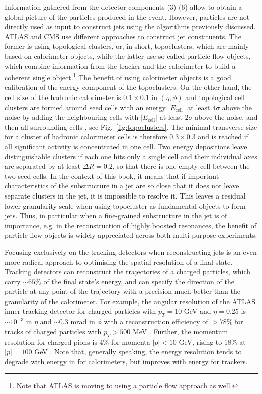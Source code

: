 Information gathered from the detector components (3)-(6) allow to
obtain a global picture of the particles produced in the
event. However, particles are not directly used as input to construct
jets using the algorithms previously discussed. ATLAS and CMS use
different approaches to construct jet constituents. The former is
using topological clusters, or, in short, topoclusters, which are
mainly based on calorimeter objects, while the latter use so-called
particle flow objects, which combine information from the tracker and
the calorimeter to build a coherent single object.\footnote{Note that
  ATLAS is moving to using a particle flow approach as well.} The
benefit of using calorimeter objects is a good calibration of the
energy component of the topoclusters. On the other hand, the cell size
of the hadronic calorimeter is $0.1 \times 0.1$ in $(\eta, \phi)$ and
topological cell clusters are formed around seed cells with an energy
$|E_\mathrm{cell}|$ at least $4 \sigma$ above the noise by adding the
neighbouring cells with $|E_\mathrm{cell}|$ at least $2\sigma$ above
the noise, and then all surrounding cells \cite{Aad:2012vm}, see
Fig.~\ref{fig:topoclusters}. The minimal transverse size for a cluster
of hadronic calorimeter cells is therefore $0.3 \times 0.3$ and is
reached if all significant activity is concentrated in one cell. Two
energy depositions leave distinguishable clusters if each one hits
only a single cell and their individual axes are separated by at least
$\Delta R = 0.2$, so that there is one empty cell between the two seed
cells. In the context of this bbok, it means that if important
characteristics of the substructure in a jet are so close that it does
not leave separate clusters in the jet, it is impossible to resolve
it. This leaves a residual lower granularity scale when using
topocluster as fundamental objects to form jets. Thus, in particular
when a fine-grained substructure in the jet is of importance, e.g. in
the reconstruction of highly boosted resonances, the benefit of
particle flow objects is widely appreciated across both multi-purpose
experiments.





Focusing exclusively on the tracking detectors when reconstructing jets is an even more radical approach to optimising the spatial resolution of a final state. Tracking detectors can reconstruct the trajectories of a charged particles, which carry $\sim 65\%$ of the final state's energy, and can specify the direction of the particle at any point of the trajectory with a precision much better than the granularity of the calorimeter. For example, the angular resolution of the ATLAS inner tracking detector for charged particles with $p_T = 10$ GeV and $\eta  = 0.25$ is $\sim 10^{-3}$ in $\eta$ and $\sim 0.3$ mrad in $\phi$ \cite{Aad:2008zzm} with a reconstruction efficiency of $> 78\%$ for tracks of charged particles with $p_T > 500$ MeV \cite{Aad:2010ac}. Further, the momentum resolution for charged pions is 4\% for momenta $|p| < 10$ GeV, rising to 18\% at $|p| = 100$ GeV \cite{Aad:2008zzm}.
%
Note that, generally speaking, the energy resolution tends to degrade
with energy in for calorimeters, but improves with energy for trackers.


